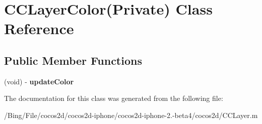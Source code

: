 \hypertarget{interface_c_c_layer_color_07_private_08}{\section{C\-C\-Layer\-Color(Private) Class Reference}
\label{interface_c_c_layer_color_07_private_08}
}
\subsection*{Public Member Functions}
\begin{DoxyCompactItemize}
\item 
\hypertarget{interface_c_c_layer_color_07_private_08_a4b9ec9ac2e5f6dd6fedeb32f6a2c6b52}{(void) -\/ {\bfseries update\-Color}}\label{interface_c_c_layer_color_07_private_08_a4b9ec9ac2e5f6dd6fedeb32f6a2c6b52}

\end{DoxyCompactItemize}


The documentation for this class was generated from the following file\-:\begin{DoxyCompactItemize}
\item 
/\-Bing/\-File/cocos2d/cocos2d-\/iphone/cocos2d-\/iphone-\/2.-\/beta4/cocos2d/C\-C\-Layer.\-m\end{DoxyCompactItemize}
